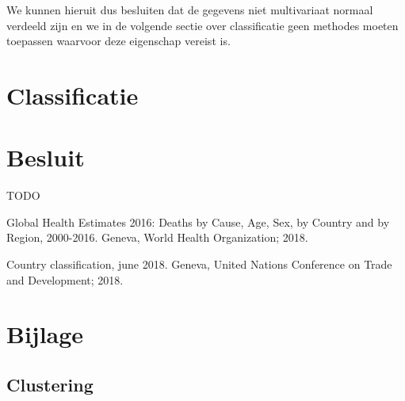 \documentclass[a4paper,kulak]{kulakarticle}
\begin{document}
We kunnen hieruit dus besluiten dat de gegevens niet multivariaat normaal verdeeld zijn en we in de volgende sectie over classificatie geen methodes moeten toepassen waarvoor deze eigenschap vereist is. 


\section{Classificatie}

\section*{Besluit}

TODO


\begin{thebibliography}{9}
	
	Global Health Estimates 2016: Deaths by Cause, Age, Sex, by Country and by Region, 2000-2016.
	Geneva, World Health Organization; 2018.
	
	Country classification, june 2018. Geneva, United Nations Conference on Trade and Development;
	2018.
	
\end{thebibliography}

\newpage
\section{Bijlage} \label{b}
\subsection{Clustering}
\end{document}
